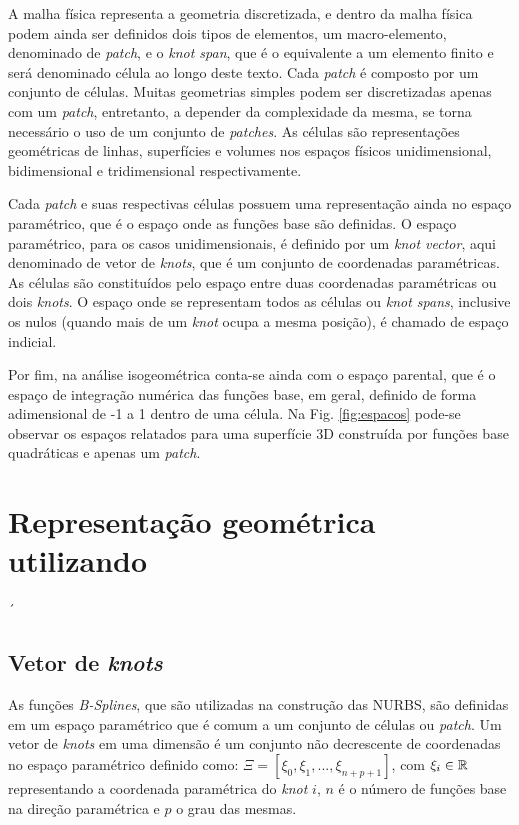 \documentclass[tese_patricia]{subfiles}
\begin{document}
A malha física representa a geometria discretizada, e dentro da malha física podem ainda ser definidos dois tipos de elementos, um macro-elemento, denominado de \textit{patch}, e o \textit{knot span}, que é o equivalente a um elemento finito e será denominado célula ao longo deste texto. Cada \textit{patch} é composto por um conjunto de células. Muitas geometrias simples podem ser discretizadas apenas com um \textit{patch}, entretanto, a depender da complexidade da mesma, se torna necessário o uso de um conjunto de \textit{patches}. As células são representações geométricas de linhas, superfícies e volumes nos espaços físicos unidimensional, bidimensional e tridimensional respectivamente.

Cada \textit{patch} e suas respectivas células possuem uma representação ainda no espaço paramétrico, que é o espaço onde as funções base são definidas. O espaço paramétrico, para os casos unidimensionais, é definido por um \textit{knot vector}, aqui denominado de vetor de \textit{knots}, que é um conjunto de coordenadas paramétricas. As células são constituídos pelo espaço entre duas coordenadas paramétricas ou dois \textit{knots}. O espaço onde se representam todos as células ou \textit{knot spans}, inclusive os nulos (quando mais de um \textit{knot} ocupa a mesma posição), é chamado de espaço indicial.

Por fim, na análise isogeométrica conta-se ainda com o espaço parental, que é o espaço de integração numérica das funções base, em geral, definido de forma adimensional de -1 a 1 dentro de uma célula. Na Fig. \ref{fig:espacos} pode-se observar os espaços relatados para uma superfície 3D construída por funções base quadráticas e apenas um \textit{patch}. 



\section{Re\-pre\-sen\-ta\-ção ge\-o\-mé\-tri\-ca u\-ti\-li\-zan\-do } \label{capitulo:Cap3:RepreGeo}´

\subsection{Vetor de \textit{knots}}

As funções \textit{B-Splines}, que são utilizadas na construção das NURBS, são definidas em um espaço paramétrico que é comum a um conjunto de células ou \textit{patch}. Um vetor de \textit{knots} em uma dimensão é um conjunto não decrescente de coordenadas no espaço paramétrico definido como: $\Xi=\left[\xi_{0},\xi_{1},...,\xi_{n+p+1}\right]$,  com $\xi_{i}\in \mathbb{R}$ representando a coordenada paramétrica do \textit{knot} $i$, $n$ é o número de funções base na direção paramétrica e $p$ o grau das mesmas.
\end{document}
